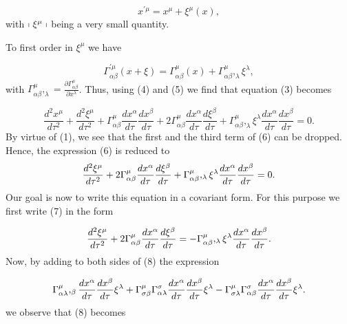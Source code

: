 \documentclass[a4paper,12pt]{article}
\begin{document}
\begin{equation}
x^{\prime \mu }=x^{\mu }+\xi ^{\mu }(x),  \label{4}
\end{equation}
with $\shortmid \xi ^{\mu }\shortmid $ being a very small quantity.

To first order in $\xi ^{\mu }$ we have

\begin{equation}
\Gamma _{\alpha \beta }^{\prime \mu }(x+\xi )=\Gamma _{\alpha \beta }^{\mu
}(x)+\Gamma _{\alpha \beta }^{\mu },_{\lambda }\xi ^{\lambda },  \label{5}
\end{equation}
with $\Gamma _{\alpha \beta }^{\mu },_{\lambda }=\frac{\partial \Gamma
_{\alpha \beta }^{\mu }}{\partial x^{\lambda }}$. Thus, using (4) and (5) we
find that equation (3) becomes

\begin{equation}
\frac{d^{2}x^{\mu }}{d\tau ^{2}}+\frac{d^{2}\xi ^{\mu }}{d\tau ^{2}}+\Gamma
_{\alpha \beta }^{\mu }\frac{dx^{\alpha }}{d\tau }\frac{dx^{\beta }}{d\tau }%
+2\Gamma _{\alpha \beta }^{\mu }\frac{dx^{\alpha }}{d\tau }\frac{d\xi
^{\beta }}{d\tau }+\Gamma _{\alpha \beta }^{\mu },_{\lambda }\xi ^{\lambda }%
\frac{dx^{\alpha }}{d\tau }\frac{dx^{\beta }}{d\tau }=0.  \label{6}
\end{equation}
By virtue of (1), we see that the first and the third term of (6) can be
dropped. Hence, the expression (6) is reduced to 
\begin{equation}
\frac{d^{2}\xi ^{\mu }}{d\tau ^{2}}+2\Gamma _{\alpha \beta }^{\mu }\frac{%
dx^{\alpha }}{d\tau }\frac{d\xi ^{\beta }}{d\tau }+\Gamma _{\alpha \beta
}^{\mu },_{\lambda }\xi ^{\lambda }\frac{dx^{\alpha }}{d\tau }\frac{%
dx^{\beta }}{d\tau }=0.  \label{7}
\end{equation}
Our goal is now to write this equation in a covariant form. For this purpose
we first write (7) in the form

\begin{equation}
\frac{d^{2}\xi ^{\mu }}{d\tau ^{2}}+2\Gamma _{\alpha \beta }^{\mu }\frac{%
dx^{\alpha }}{d\tau }\frac{d\xi ^{\beta }}{d\tau }=-\Gamma _{\alpha \beta
}^{\mu },_{\lambda }\xi ^{\lambda }\frac{dx^{\alpha }}{d\tau }\frac{%
dx^{\beta }}{d\tau }.  \label{8}
\end{equation}
Now, by adding to both sides of (8) the expression

\begin{equation}
\Gamma _{\alpha \lambda }^{\mu },_{\beta }\frac{dx^{\alpha }}{d\tau }\frac{%
dx^{\beta }}{d\tau }\xi ^{\lambda }+\Gamma _{\sigma \beta }^{\mu }\Gamma
_{\alpha \lambda }^{\sigma }\frac{dx^{\alpha }}{d\tau }\frac{dx^{\beta }}{%
d\tau }\xi ^{\lambda }-\Gamma _{\sigma \lambda }^{\mu }\Gamma _{\alpha \beta
}^{\sigma }\frac{dx^{\alpha }}{d\tau }\frac{dx^{\beta }}{d\tau }\xi
^{\lambda }.  \label{9}
\end{equation}
we observe that (8) becomes
\end{document}
